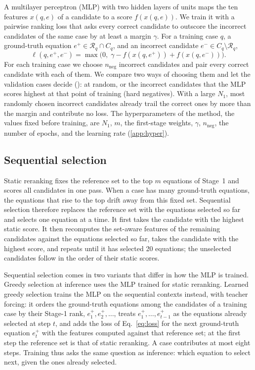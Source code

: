 A multilayer perceptron (MLP) with two hidden layers of \Hidden{} units maps the ten features
$x(q, e)$ of a candidate to a score $f(x(q, e))$. We train it with a pairwise ranking loss
\citep{LTR} that asks every correct candidate to outscore the incorrect candidates of the same case
by at least a margin $\gamma$. For a training case $q$, a ground-truth equation
$e^{+} \in \mathcal{R}_q \cap C_q$, and an incorrect candidate
$e^{-} \in C_q \setminus \mathcal{R}_q$,
\begin{equation}
  \ell(q, e^{+}, e^{-}) = \max\!\big(0,\; \gamma - f(x(q, e^{+})) + f(x(q, e^{-}))\big) .
  \label{eq:loss}
\end{equation}
For each training case we choose $n_{\mathrm{neg}}$ incorrect candidates and pair every correct
candidate with each of them. We compare two ways of choosing them and let the validation cases
decide (): at random, or the incorrect candidates that the MLP scores
highest at that point of training (hard negatives). With a large $N_1$, most randomly chosen
incorrect candidates already trail the correct ones by more than the margin and contribute no loss.
The hyperparameters of the method, the values fixed before training, are $N_1$, $m$, the
first-stage weights, $\gamma$, $n_{\mathrm{neg}}$, the number of epochs, and the learning rate
(\ref{app:hyper}).

\subsection{Sequential selection}\label{sec:seq}

Static reranking fixes the reference set to the top $m$ equations of Stage~1 and scores all
candidates in one pass. When a case has many ground-truth equations, the equations that rise to
the top drift away from this fixed set. Sequential selection therefore replaces the reference set
with the equations selected so far and selects one equation at a time. It first takes the candidate
with the highest static score. It then recomputes the set-aware features of the remaining
candidates against the equations selected so far, takes the candidate with the highest score, and
repeats until it has selected 20 equations; the unselected candidates follow in the order of their
static scores.

Sequential selection comes in two variants that differ in how the MLP is trained. Greedy selection
at inference uses the MLP trained for static reranking. Learned greedy selection trains the MLP on
the sequential contexts instead, with teacher forcing: it orders the ground-truth equations among
the candidates of a training case by their Stage-1 rank, $e^{+}_1, e^{+}_2, \dots$, treats
$e^{+}_1, \dots, e^{+}_{t-1}$ as the equations already selected at step $t$, and adds the loss of
Eq.~\eqref{eq:loss} for the next ground-truth equation $e^{+}_t$ with the features computed against
that reference set; at the first step the reference set is that of static reranking. A case
contributes at most eight steps. Training thus asks the same question as
inference: which equation to select next, given the ones already selected.
